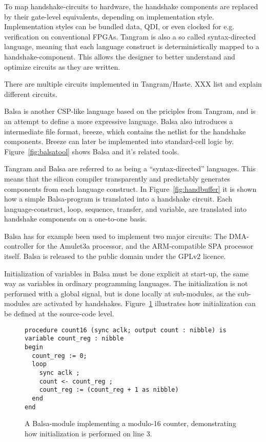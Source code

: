 To map handshake-circuits to hardware, the handshake components are
replaced by their gate-level equivalents, depending on implementation
style. Implementation styles can be bundled data, QDI, or even clocked
for e.g. verification on conventional FPGAs. Tangram is also a so
called syntax-directed language, meaning that each language construct
is deterministically mapped to a handshake-component. This allows the
designer to better understand and optimize circuits as they are
written.

There are multiple circuits implemented in Tangram/Haste. XXX list and
explain different circuits.

Balsa is another CSP-like language based on the priciples from Tangram,
and is an attempt to define a more expressive language. Balsa also
introduces a intermediate file format, breeze, which contains the
netlist for the handshake components. Breeze can later be implemented
into standard-cell logic by. Figure~\ref{fig:balsatool} shows Balsa
and it's related tools.

Tangram and Balsa are referred to as being a ``syntax-directed''
languages. This means that the silicon compiler transparently and
predictably generates components from each language construct. In
Figure~\ref{fig:handbuffer} it is shown how a simple Balsa-program is
translated into a handshake circuit. Each language-construct, loop,
sequence, transfer, and variable, are translated into handshake
components on a one-to-one basis.

Balsa has for example been used to implement two major circuits: The
DMA-controller for the Amulet3a processor, and the ARM-compatible SPA
processor itself. Balsa is released to the public domain under the
GPLv2 licence.

\label{par:init}
Initialization of variables in Balsa must be done explicit at
start-up, the same way as variables in ordinary programming
languages. The initialization is not performed with a global signal,
but is done locally at sub-modules, as the sub-modules are activated
by handshakes. Figure~\ref{fig:init} illustrates how initialization
can be defined at the source-code level.

\begin{figure}[htbp]
\begin{lstlisting}
procedure count16 (sync aclk; output count : nibble) is
variable count_reg : nibble
begin
  count_reg := 0;
  loop
    sync aclk ;
    count <- count_reg ;
    count_reg := (count_reg + 1 as nibble)
  end
end
\end{lstlisting}
\caption{A Balsa-module implementing a modulo-16 counter, demonstrating how initialization is performed on line 3.}
\label{fig:init}
\end{figure}


